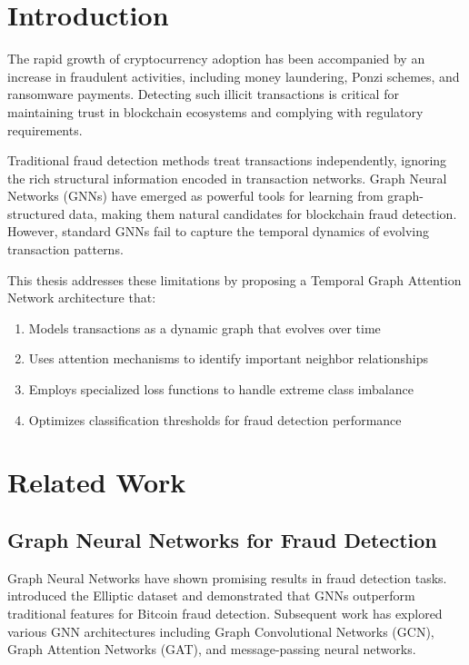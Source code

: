 \documentclass[12pt,a4paper]{article}
\begin{document}
\section{Introduction}

The rapid growth of cryptocurrency adoption has been accompanied by an increase in fraudulent activities, including money laundering, Ponzi schemes, and ransomware payments. Detecting such illicit transactions is critical for maintaining trust in blockchain ecosystems and complying with regulatory requirements.

Traditional fraud detection methods treat transactions independently, ignoring the rich structural information encoded in transaction networks. Graph Neural Networks (GNNs) have emerged as powerful tools for learning from graph-structured data, making them natural candidates for blockchain fraud detection. However, standard GNNs fail to capture the temporal dynamics of evolving transaction patterns.

This thesis addresses these limitations by proposing a Temporal Graph Attention Network architecture that:
\begin{enumerate}
    \item Models transactions as a dynamic graph that evolves over time
    \item Uses attention mechanisms to identify important neighbor relationships
    \item Employs specialized loss functions to handle extreme class imbalance
    \item Optimizes classification thresholds for fraud detection performance
\end{enumerate}

\section{Related Work}

\subsection{Graph Neural Networks for Fraud Detection}
Graph Neural Networks have shown promising results in fraud detection tasks. \citet{weber2019anti} introduced the Elliptic dataset and demonstrated that GNNs outperform traditional features for Bitcoin fraud detection. Subsequent work has explored various GNN architectures including Graph Convolutional Networks (GCN), Graph Attention Networks (GAT), and message-passing neural networks.
\end{document}
